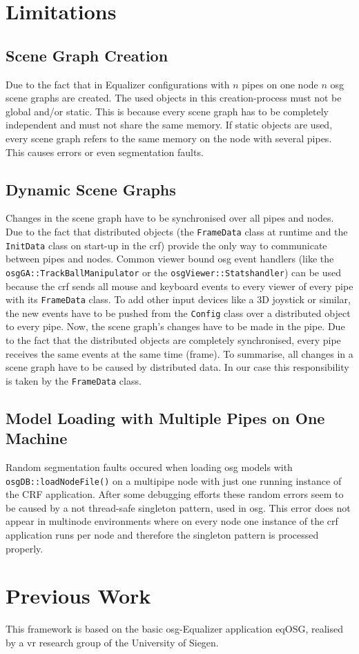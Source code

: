 \section{Limitations}
\label{sec:crfLimitations}
\subsection{Scene Graph Creation}
Due to the fact that in Equalizer configurations with $n$ pipes on one node $n$ \gls{osg} scene graphs are created. The used objects in this creation-process must not be global and/or static. This is because every scene graph has to be completely independent and must not share the same memory. If static objects are used, every scene graph refers to the same memory on the node with several pipes. This causes errors or even segmentation faults.

\subsection{Dynamic Scene Graphs}
Changes in the scene graph have to be synchronised over all pipes and nodes. Due to the fact that distributed objects (the \texttt{FrameData} class at runtime and the \texttt{InitData} class on start-up in the \gls{crf}) provide the only way to communicate between pipes and nodes. 
Common viewer bound \gls{osg} event handlers (like the \texttt{osgGA::TrackBallManipulator} or the \texttt{osgViewer::Statshandler}) can be used because the \gls{crf} sends all mouse and keyboard events to every viewer of every pipe with its \texttt{FrameData} class. 
To add other input devices like a 3D joystick or similar, the new events have to be pushed from the \texttt{Config} class over a distributed object to every pipe. Now, the scene graph's changes have to be made in the pipe. Due to the fact that the distributed objects are completely synchronised, every pipe receives the same events at the same time (frame). To summarise, all changes in a scene graph have to be caused by distributed data. In our case this responsibility is taken by the \texttt{FrameData} class.

\subsection{Model Loading with Multiple Pipes on One Machine}
Random segmentation faults occured when loading \gls{osg} models with \texttt{osgDB::loadNodeFile()} on a multipipe node with just one running instance of the CRF application. After some debugging efforts these random errors seem to be caused by a not thread-safe singleton pattern, used in \gls{osg}.
This error does not appear in multinode environments where on every node one instance of the \gls{crf} application runs per node and therefore the singleton pattern is processed properly.

\section{Previous Work}
This framework is based on the basic \gls{osg}-Equalizer application eqOSG, realised by a \gls{vr} research group of the University of Siegen. 
